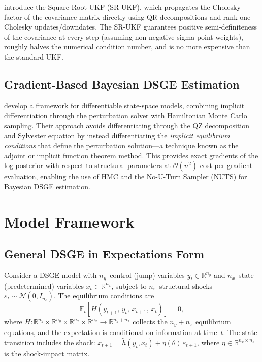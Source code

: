 \documentclass[12pt,a4paper]{article}
\newcommand{\R}{\mathbb{R}}
\newcommand{\E}{\mathbb{E}}
\newcommand{\cO}{\mathcal{O}}
\begin{document}
\citet{van2001square} introduce the Square-Root UKF (SR-UKF), which
propagates the Cholesky factor of the covariance matrix directly using
QR decompositions and rank-one Cholesky updates/downdates. The SR-UKF
guarantees positive semi-definiteness of the covariance at every step
(assuming non-negative sigma-point weights), roughly halves the
numerical condition number, and is no more expensive than the standard
UKF.

\subsection{Gradient-Based Bayesian DSGE Estimation}

\citet{childers2024differentiable} develop a framework for
differentiable state-space models, combining implicit
differentiation through the perturbation solver with Hamiltonian
Monte Carlo sampling. Their approach avoids differentiating through
the QZ decomposition and Sylvester equation by instead differentiating
the \emph{implicit equilibrium conditions} that define the
perturbation solution---a technique known as the adjoint or implicit
function theorem method. This provides exact gradients of the
log-posterior with respect to structural parameters at
$\cO(n^2)$ cost per gradient evaluation, enabling the use of HMC
and the No-U-Turn Sampler (NUTS) for Bayesian DSGE estimation.


\section{Model Framework}\label{sec:model}

\subsection{General DSGE in Expectations Form}

Consider a DSGE model with $n_y$~control (jump) variables
$y_t \in \R^{n_y}$ and $n_x$~state (predetermined) variables
$x_t \in \R^{n_x}$, subject to $n_\varepsilon$~structural shocks
$\varepsilon_t \sim \mathcal{N}(0, I_{n_\varepsilon})$. The
equilibrium conditions are
\begin{equation}\label{eq:dsge}
\E_t\!\left[
  H\!\left(y_{t+1},\, y_t,\, x_{t+1},\, x_t\right)
\right] = 0,
\end{equation}
where $H : \R^{n_y} \times \R^{n_y} \times \R^{n_x} \times \R^{n_x}
\to \R^{n_y + n_x}$ collects the $n_y + n_x$ equilibrium equations,
and the expectation is conditional on information at time~$t$. The
state transition includes the shock:
$x_{t+1} = \tilde{h}(y_t, x_t) + \eta(\theta)\,\varepsilon_{t+1}$,
where $\eta \in \R^{n_x \times n_\varepsilon}$ is the shock-impact
matrix.
\end{document}
